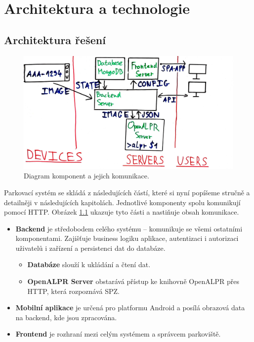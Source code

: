 
\chapter{Architektura a technologie} \label{archtech}

\section{Architektura řešení} \label{architektura_reseni}

\begin{figure} \centering
  \includegraphics[width=145mm]{../img/architecture_drawing.jpg}
  \caption{Diagram komponent a jejich komunikace.}
  \label{fig:architecture_drawing}
\end{figure}

\noindent
Parkovací systém se skládá z následujících částí, které si nyní popíšeme stručně a detailněji v
následujících kapitolách.
Jednotlivé komponenty spolu komunikují pomocí HTTP.
Obrázek \ref{fig:architecture_drawing} ukazuje tyto části a nastiňuje obsah komunikace.

\begin{itemize}
  \setlength\itemsep{.05em}
  \item \textbf{Backend} je středobodem celého systému -- komunikuje se všemi ostatními komponentami.
  Zajišťuje business logiku aplikace, autentizaci i autorizaci uživatelů i zařízení
  a persistenci dat do databáze.
  \begin{itemize}
    \setlength\itemsep{.05em}
    \item \textbf{Databáze} slouží k ukládání a čtení dat.
    \item \textbf{OpenALPR Server} obstarává přístup
          ke knihovně OpenALPR přes HTTP, která rozpoznává SPZ.
  \end{itemize}
  \item \textbf{Mobilní aplikace} je určená pro platformu Android a posílá obrazová data na backend,
        kde jsou zpracována.
  \item \textbf{Frontend} je rozhraní mezi celým systémem a správcem parkoviště.
\end{itemize}


